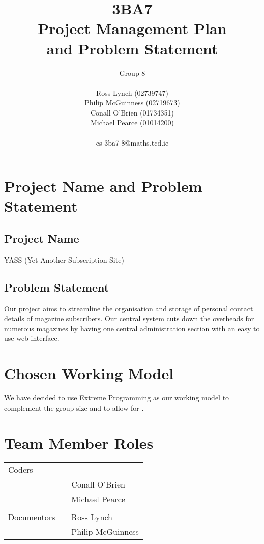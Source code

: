 \documentclass[a4paper,12pt]{article}
\begin{document}
\title{3BA7 \\ Project Management Plan \\ and Problem Statement}

\author{Group 8 \\ \\ Ross Lynch (02739747) \\ Philip McGuinness (02719673) \\ Conall O'Brien (01734351) \\ Michael Pearce (01014200) \\ \\ cs-3ba7-8@maths.tcd.ie}

\maketitle

\section{Project Name and Problem Statement}

\subsection{Project Name}

YASS (Yet Another Subscription Site)

\subsection{Problem Statement}

Our project aims to streamline the organisation and storage of personal
contact details of magazine subscribers. Our central system cuts down
the overheads for numerous magazines by having one central
administration section with an easy to use web interface.

\section{Chosen Working Model}

We have decided to use Extreme Programming as our working model to
complement the group size and to allow for .

\section{Team Member Roles}

\begin{tabular}{lll}
Coders	&	\hspace{10mm}	&	\\
			&						&	Conall O'Brien	\\
			&						&	Michael Pearce	\\
			&						&	\\
Documentors	&					&	Ross Lynch		\\
			&						&	Philip McGuinness
\end{tabular}
\end{document}
